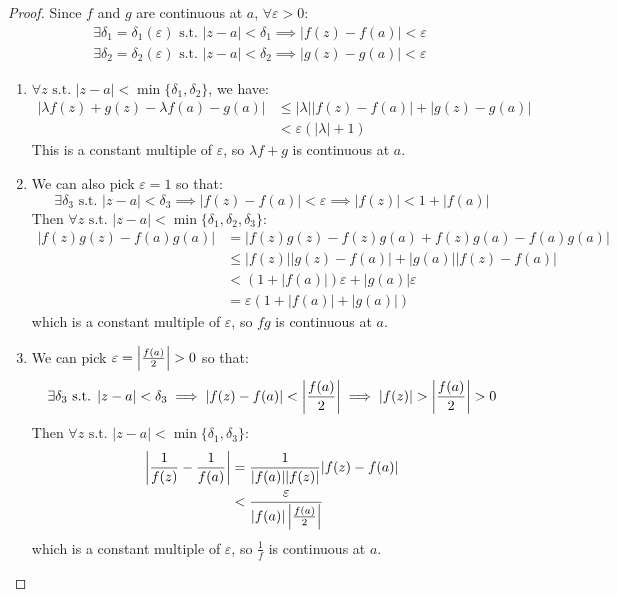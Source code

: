 \documentclass[../main.tex]{subfiles}
\begin{document}
\begin{proof}
  Since $f$ and $g$ are continuous at $a$, $\forall \varepsilon > 0$:
  \begin{align*}
    \exists \delta_1 = \delta_1(\varepsilon) \text{ s.t. } |z - a| < \delta_1 \implies |f(z) - f(a)| < \varepsilon \\
    \exists \delta_2 = \delta_2(\varepsilon) \text{ s.t. } |z - a| < \delta_2 \implies |g(z) - g(a)| < \varepsilon
  \end{align*}
  \begin{enumerate}
    \item $\forall z \text{ s.t. } |z - a| < \min\{\delta_1, \delta_2\}$, we have:
      \begin{align*}
        |\lambda f(z) + g(z) - \lambda f(a) - g(a)| &\leq |\lambda||f(z) - f(a)| + |g(z) - g(a)| \\
                                                    &< \varepsilon(|\lambda| + 1)
      \end{align*}
      This is a constant multiple of $\varepsilon$, so $\lambda f + g$ is continuous at $a$.
    \item We can also pick $\varepsilon = 1$ so that:
      \[
        \exists \delta_3 \text{ s.t. } |z - a| < \delta_3 \implies |f(z) - f(a)| < \varepsilon \implies |f(z)| < 1 + |f(a)|
      \]
      Then $\forall z \text{ s.t. } |z - a| < \min\{\delta_1, \delta_2, \delta_3\}$:
      \begin{align*}
        |f(z)g(z) - f(a)g(a)| &= |f(z)g(z) - f(z)g(a) + f(z)g(a) - f(a)g(a)| \\
                        &\leq |f(z)||g(z) - f(a)| + |g(a)||f(z) - f(a)| \\
                        &< (1 + |f(a)|)\varepsilon + |g(a)|\varepsilon \\
                        &= \varepsilon(1 + |f(a)| + |g(a)|)
      \end{align*}
      which is a constant multiple of $\varepsilon$, so $fg$ is continuous at $a$.
    \item We can pick $\varepsilon = \left\lvert \frac{f(a)}{2} \right\rvert > 0$ so that:
      \[
        \exists \delta_3 \text{ s.t. } |z - a| < \delta_3 \implies |f(z) - f(a)| < \left\lvert \frac{f(a)}{2} \right\rvert \implies |f(z)| > \left\lvert \frac{f(a)}{2} \right\rvert > 0
      \]
      Then $\forall z \text{ s.t. } |z - a| < \min\{\delta_1, \delta_3\}$:
      \begin{align*}
        \left\lvert \frac{1}{f(z)} - \frac{1}{f(a)} \right\rvert &= \frac{1}{|f(a)||f(z)|}|f(z) - f(a)| \\
                                       &< \frac{\varepsilon}{|f(a)|\left\lvert \frac{f(a)}{2} \right\rvert}
      \end{align*}
      which is a constant multiple of $\varepsilon$, so $\frac{1}{f}$ is continuous at $a$.
  \end{enumerate}
\end{proof}
\end{document}
